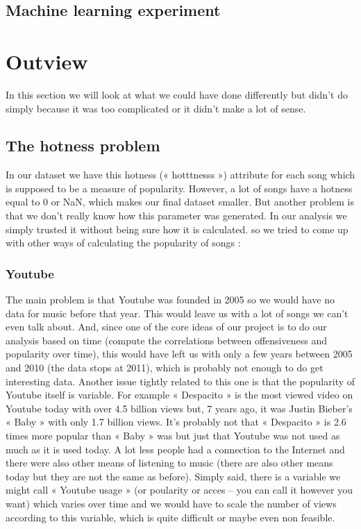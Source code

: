 \documentclass[11pt]{article}
\begin{document}
\subsection{Machine learning experiment}


\section{Outview}
In this section we will look at what we could have done differently but didn’t do simply because it was
too complicated or it didn’t make a lot of sense.

\subsection{The hotness problem}
In our dataset we have this hotness (« hotttnesss ») attribute for each song which is
supposed to be a measure of popularity. However, a lot of songs have a hotness equal to 0 or NaN, which
makes our final dataset smaller. But another problem is that we don’t really know how this parameter was
generated. In our analysis we simply trusted it without being sure how it is calculated.
so we tried to come up with other ways of calculating the popularity of songs :

\subsubsection{Youtube}
The main problem is that Youtube was founded in 2005 so we would have no data for music before that
year. This would leave us with a lot of songs we can’t even talk about. And, since one of the core ideas of
our project is to do our analysis based on time (compute the correlations between offensiveness and
popularity over time), this would have left us with only a few years between 2005 and 2010 (the data
stops at 2011), which is probably not enough to do get interesting data. Another issue tightly related to
this one is that the popularity of Youtube itself is variable. For example « Despacito » is the most viewed
video on Youtube today with over 4.5 billion views but, 7 years ago, it was Justin Bieber’s « Baby » with
only 1.7 billion views. It’s probably not that « Despacito » is 2.6 times more popular than « Baby » was
but just that Youtube was not used as much as it is used today. A lot less people had a connection to the
Internet and there were also other means of listening to music (there are also other means today but they
are not the same as before). Simply said, there is a variable we might call « Youtube usage » (or poularity
or acces – you can call it however you want) which varies over time and we would have to scale the
number of views according to this variable, which is quite difficult or maybe even non feasible.
\end{document}
